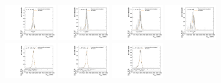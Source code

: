 \begin{figure}[htpb]
  \centering
  \includegraphics[width=0.2\textwidth]{fig/analysisAppendix/templateVsReco_RadToWW2000_r0_MVV_mu_HP_bb_LDy_linear.pdf}
  \includegraphics[width=0.2\textwidth]{fig/analysisAppendix/templateVsReco_RadToWW2000_r0_MVV_mu_LP_bb_LDy_linear.pdf}
  \includegraphics[width=0.2\textwidth]{fig/analysisAppendix/templateVsReco_RadToWW2000_r0_MVV_mu_HP_bb_HDy_linear.pdf}
  \includegraphics[width=0.2\textwidth]{fig/analysisAppendix/templateVsReco_RadToWW2000_r0_MVV_mu_LP_bb_HDy_linear.pdf}\\
  \includegraphics[width=0.2\textwidth]{fig/analysisAppendix/templateVsReco_RadToWW2000_r0_MVV_mu_HP_nobb_LDy_linear.pdf}
  \includegraphics[width=0.2\textwidth]{fig/analysisAppendix/templateVsReco_RadToWW2000_r0_MVV_mu_LP_nobb_LDy_linear.pdf}
  \includegraphics[width=0.2\textwidth]{fig/analysisAppendix/templateVsReco_RadToWW2000_r0_MVV_mu_HP_nobb_HDy_linear.pdf}

\end{figure}

